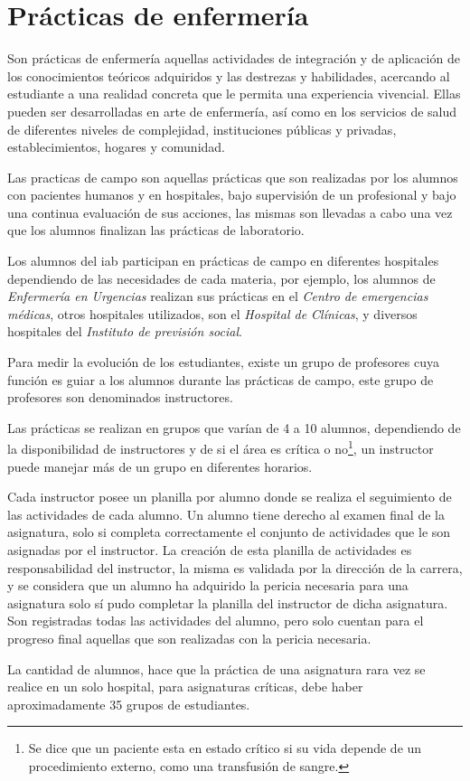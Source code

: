 \section{Prácticas de enfermería}
\label{sec:practica_hos}

Son prácticas de enfermería aquellas actividades de integración y de aplicación
de los conocimientos teóricos adquiridos y las destrezas y habilidades,
acercando al estudiante a una realidad concreta que le permita una experiencia
vivencial. Ellas pueden ser desarrolladas en arte de enfermería, así como en los
servicios de salud de diferentes niveles de complejidad, instituciones públicas
y privadas, establecimientos, hogares y comunidad\cite{iab:est_enfemeria}.

Las practicas de campo son aquellas prácticas que son realizadas por los alumnos
con pacientes humanos y en hospitales, bajo supervisión de un profesional y bajo
una continua evaluación de sus acciones, las mismas son llevadas a cabo una vez
que los alumnos finalizan las prácticas de laboratorio.

Los alumnos del \Gls{iab} participan en prácticas de campo en diferentes
hospitales dependiendo de las necesidades de cada materia, por ejemplo, los
alumnos de \textit{Enfermería en Urgencias} realizan sus prácticas en el
\textit{Centro de emergencias médicas}, otros hospitales utilizados, son el
\textit{Hospital de Clínicas}, y diversos hospitales del \textit{Instituto de
    previsión social}.

Para medir la evolución de los estudiantes, existe un grupo de profesores cuya
función es guiar a los alumnos durante las prácticas de campo, este grupo de
profesores son denominados instructores.

Las prácticas se realizan en grupos que varían de 4 a 10 alumnos, dependiendo de
la disponibilidad de instructores y de si el área es crítica o no\footnote{Se
    dice que un paciente esta en estado crítico si su vida depende de un
    procedimiento externo, como una transfusión de sangre.}, un instructor puede
manejar más de un grupo en diferentes horarios. 

Cada instructor posee un planilla por alumno donde se realiza el seguimiento de
las actividades de cada alumno. Un alumno tiene derecho al examen final de la
asignatura, solo si completa correctamente el conjunto de actividades que le son
asignadas por el instructor. La creación de esta planilla de actividades es
responsabilidad del instructor, la misma es validada por la dirección de la
carrera, y se considera que un alumno ha adquirido la pericia necesaria para una
asignatura solo sí pudo completar la planilla del instructor de dicha
asignatura. Son registradas todas las actividades del alumno, pero solo cuentan
para el progreso final aquellas que son realizadas con la pericia necesaria.

La cantidad de alumnos, hace que la práctica de una asignatura rara vez se
realice en un solo hospital, para asignaturas críticas, debe haber
aproximadamente 35 grupos de estudiantes.
